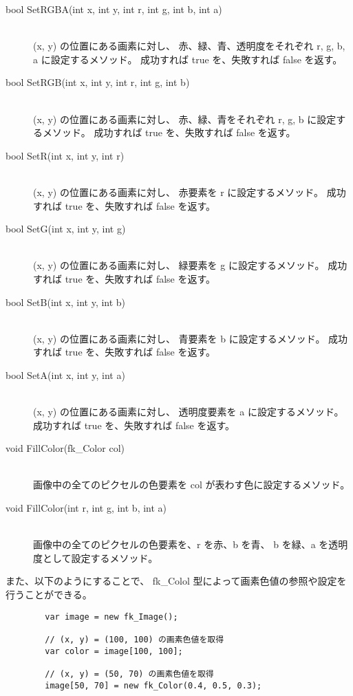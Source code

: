 \begin{description}
\item[bool SetRGBA(int x, int y, int r, int g, int b, int a)] ~ \\
	(x, y) の位置にある画素に対し、
	赤、緑、青、透明度をそれぞれ r, g, b, a に設定するメソッド。
	成功すれば true を、失敗すれば false を返す。\\

\item[bool SetRGB(int x, int y, int r, int g, int b)] ~ \\
	(x, y) の位置にある画素に対し、
	赤、緑、青をそれぞれ r, g, b に設定するメソッド。
	成功すれば true を、失敗すれば false を返す。\\

\item[bool SetR(int x, int y, int r)] ~ \\
	(x, y) の位置にある画素に対し、
	赤要素を r に設定するメソッド。
	成功すれば true を、失敗すれば false を返す。\\

\item[bool SetG(int x, int y, int g)] ~ \\
	(x, y) の位置にある画素に対し、
	緑要素を g に設定するメソッド。
	成功すれば true を、失敗すれば false を返す。\\

\item[bool SetB(int x, int y, int b)] ~ \\
	(x, y) の位置にある画素に対し、
	青要素を b に設定するメソッド。
	成功すれば true を、失敗すれば false を返す。\\

\item[bool SetA(int x, int y, int a)] ~ \\
	(x, y) の位置にある画素に対し、
	透明度要素を a に設定するメソッド。
	成功すれば true を、失敗すれば false を返す。\\

\item[void FillColor(fk\_Color col)] ~ \\
	画像中の全てのピクセルの色要素を col が表わす色に設定するメソッド。\\

\item[void FillColor(int r, int g, int b, int a)] ~ \\
	画像中の全てのピクセルの色要素を、r を赤、b を青、
	b を緑、a を透明度として設定するメソッド。\\
\end{description}

また、以下のようにすることで、
fk\_Colol 型によって画素色値の参照や設定を行うことができる。
\\
\begin{breakbox}
\begin{verbatim}
        var image = new fk_Image();

        // (x, y) = (100, 100) の画素色値を取得
        var color = image[100, 100];

        // (x, y) = (50, 70) の画素色値を取得
        image[50, 70] = new fk_Color(0.4, 0.5, 0.3);
\end{verbatim}
\end{breakbox}
